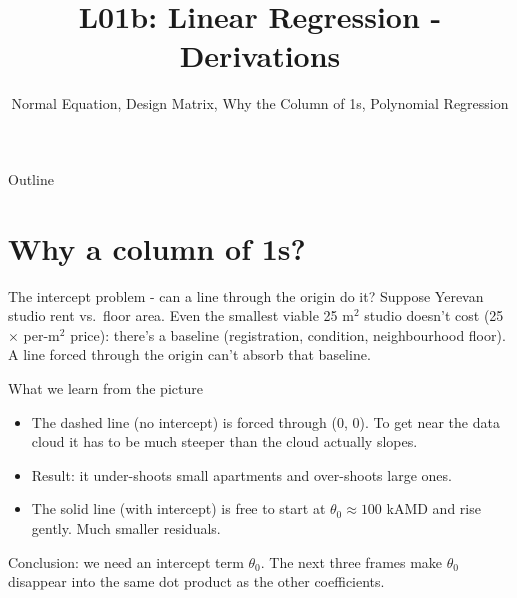 \documentclass[aspectratio=169]{beamer}
\title{L01b: Linear Regression - Derivations}
\subtitle{Normal Equation, Design Matrix, Why the Column of 1s, Polynomial Regression}
\date{}
\begin{document}
\begin{frame}{Outline}
  \tableofcontents
\end{frame}

\section{Why a column of 1s?}

\begin{frame}{The intercept problem - can a line through the origin do it?}
  Suppose Yerevan studio rent vs.\ floor area. Even the smallest viable 25 m$^2$ studio doesn't cost (25 $\times$ per-m$^2$ price): there's a baseline (registration, condition, neighbourhood floor). A line forced through the origin can't absorb that baseline.
  \vfill
  \begin{center}
  \end{center}
\end{frame}

\begin{frame}{What we learn from the picture}
  \begin{itemize}
    \item The \textcolor{armblue}{dashed line} (no intercept) is forced through (0, 0). To get near the data cloud it has to be much steeper than the cloud actually slopes.
    \item Result: it under-shoots small apartments and over-shoots large ones.
    \item The \textcolor{paramgreen}{solid line} (with intercept) is free to start at $\theta_0 \approx 100$ kAMD and rise gently. Much smaller residuals.
  \end{itemize}
  \vfill
  Conclusion: we need an intercept term $\theta_0$. The next three frames make $\theta_0$ disappear into the same dot product as the other coefficients.
\end{frame}
\end{document}
